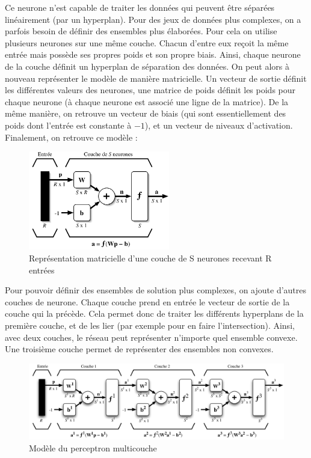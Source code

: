Ce neurone n'est capable de traiter les données qui peuvent être séparées linéairement (par un hyperplan). Pour des jeux de données plus complexes,
on a parfois besoin de définir des ensembles plus élaborées.
Pour cela on utilise plusieurs neurones sur une même couche. Chacun d'entre eux reçoit la même entrée mais possède ses propres poids et son propre biais.
Ainsi, chaque neurone de la couche définit un hyperplan de séparation des données. On peut alors à nouveau représenter le modèle de manière matricielle.
Un vecteur de sortie définit les différentes valeurs des neurones, une matrice de poids définit les poids pour chaque neurone (à chaque neurone est associé
une ligne de la matrice). De la même manière, on retrouve un vecteur de biais (qui sont essentiellement des poids dont l'entrée est constante à $-1$), et 
un vecteur de niveaux d'activation. Finalement, on retrouve ce modèle : 

\begin{figure}[h]
 \centering
 \includegraphics[width=0.55\textwidth]{img/couche.png}
 \caption[Modèle d'une couche de neurones]{Représentation matricielle d'une couche de S neurones recevant R entrées}
\end{figure}

Pour pouvoir définir des ensembles de solution plus complexes, on ajoute d'autres couches de neurone. Chaque couche prend en entrée le vecteur de sortie
de la couche qui la précède. Cela permet donc de traiter les différents hyperplans de la première couche, et de les lier (par exemple pour en faire
l'intersection). Ainsi, avec deux couches, le réseau peut représenter n'importe quel ensemble convexe. Une troisième couche permet de représenter des
ensembles non convexes.

\begin{figure}[h]
 \centering
 \includegraphics[width=\textwidth]{img/modele_perceptron_multicouches.png}
 \caption{Modèle du perceptron multicouche}
\end{figure}


